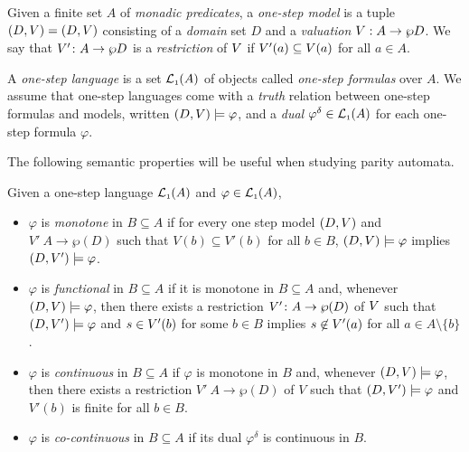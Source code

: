 \begin{definition}
Given a finite set $A$ of \emph{monadic predicates}, a \emph{one-step model} is a tuple $(D, V) = (D,V)$
consisting of a \emph{domain} set $D$ and a \emph{valuation} $V : A \to \wp D$. We say that $V' \colon A \to \wp D$ is a \emph{restriction} of $V$ if $V'(a) \subseteq V(a)$ for all $a\in A$.


A \emph{one-step language} is a set $\mathcal{L}_{\scriptscriptstyle 1}(A)$ of objects called \emph{one-step formulas} over $A$. We assume that one-step languages come with a \emph{truth} relation between one-step formulas and models, written $(D, V) \models \varphi$, and a \emph{dual} $\varphi^{\delta} \in \mathcal{L}_{\scriptscriptstyle 1}(A)$ for each one-step formula $\varphi$.
\end{definition}

The following semantic properties will be useful when studying parity automata.

\begin{definition}\label{def:semnotions} Given a one-step language $\mathcal{L}_{\scriptscriptstyle 1}(A)$ and $\varphi \in \mathcal{L}_{\scriptscriptstyle 1}(A)$,
\begin{itemize}
\item $\varphi$ is \emph{monotone} in $B \subseteq A$ if for every one step model $(D,V)$ and $V' \: A \to \wp(D)$ such that $V(b) \subseteq V'(b)$ for all $b \in B$, $(D,V) \models \varphi$ implies $(D,V') \models \varphi$.
\item $\varphi$ is \emph{functional} in $B\subseteq A$ if it is monotone in $B \subseteq A$ and, whenever $(D,V) \models \varphi$, then there exists a restriction $V' \colon A \to \wp(D)$ of $V$ such that $(D,V') \models \varphi$ and $s \in V'(b)$ for some $b \in B$ implies $s \not\in V'(a)$ for all $a \in A\setminus\{b\}$.
\item $\varphi$ is \emph{continuous} in $B \subseteq A$ if $\varphi$ is monotone in $B$ and, whenever $(D,V) \models \varphi$, then there exists a restriction $V' \: A \to \wp(D)$ of $V$ such that $(D,V') \models \varphi$ and $V'(b)$ is finite for all $b \in B$.
\item $\varphi$ is \emph{co-continuous} in $B \subseteq A$ if its dual $\varphi^{\delta}$ is continuous in $B$.
\end{itemize}
\end{definition}


